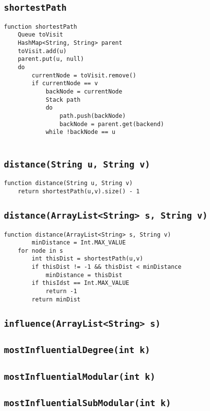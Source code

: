 \documentclass[10pt,letterpaper]{article}
\begin{document}
\subsection{\texttt{shortestPath}}
\begin{verbatim}
function shortestPath
   	Queue toVisit
   	HashMap<String, String> parent
   	toVisit.add(u)
   	parent.put(u, null)
   	do
   	    currentNode = toVisit.remove()
   	    if currentNode == v
   	        backNode = currentNode
   	        Stack path
   	        do 
   	            path.push(backNode)
   	            backNode = parent.get(backend)
   	        while !backNode == u
   			
\end{verbatim}
\subsection{\texttt{distance(String u, String v)}}
\begin{verbatim}
function distance(String u, String v) 
   	return shortestPath(u,v).size() - 1
\end{verbatim}
\subsection{\texttt{distance(ArrayList<String> s, String v)}}
\begin{verbatim}
function distance(ArrayList<String> s, String v) 
        minDistance = Int.MAX_VALUE
    for node in s
        int thisDist = shortestPath(u,v)
        if thisDist != -1 && thisDist < minDistance
            minDistance = thisDist
        if thisIdst == Int.MAX_VALUE
            return -1
        return minDist
\end{verbatim}
\subsection{\texttt{influence(ArrayList<String> s)}}
\subsection{\texttt{mostInfluentialDegree(int k)}}
\subsection{\texttt{mostInfluentialModular(int k)}}
\subsection{\texttt{mostInfluentialSubModular(int k)}}
\end{document}
